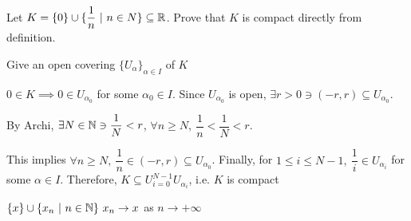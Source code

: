 Let $K = \{0\} \cup \{\dfrac{1}{n}~|~  n \in N\} \subseteq \mathbb{R}$. Prove that $K$ is compact directly from definition.

\begin{tcolorbox}
	\begin{solution}
		Give an open covering $\{U_{\alpha}\}_{\alpha \in I}$ of $K$
		
		$0 \in K \implies 0 \in U_{\alpha_0}$ for some $\alpha_0 \in I$. Since $U_{\alpha_0}$ is open, $\exists r > 0 \ni (-r,r) \subseteq U_{\alpha_0}$. 
		
		By Archi, $\exists N \in \mathbb{N} \ni \dfrac{1}{N} < r$, $\forall n \geq N,~ \dfrac{1}{n} < \dfrac{1}{N} < r$.
		
		This implies $\forall n \geq N,~\dfrac{1}{n} \in (-r,r) \subseteq U_{\alpha_0}$. Finally, for $1 \leq i \leq N-1,~ \dfrac{1}{i} \in U_{\alpha_i}$ for some $\alpha \in I$. Therefore, $K \subseteq U_{i = 0}^{N-1}U_{\alpha_i}$, i.e. $K$ is compact
		
		$\{x\} \cup \{x_n ~|~ n \in \mathbb{N}\}~ x_n \rightarrow x$ as $n \rightarrow +\infty$
	\end{solution}
\end{tcolorbox}